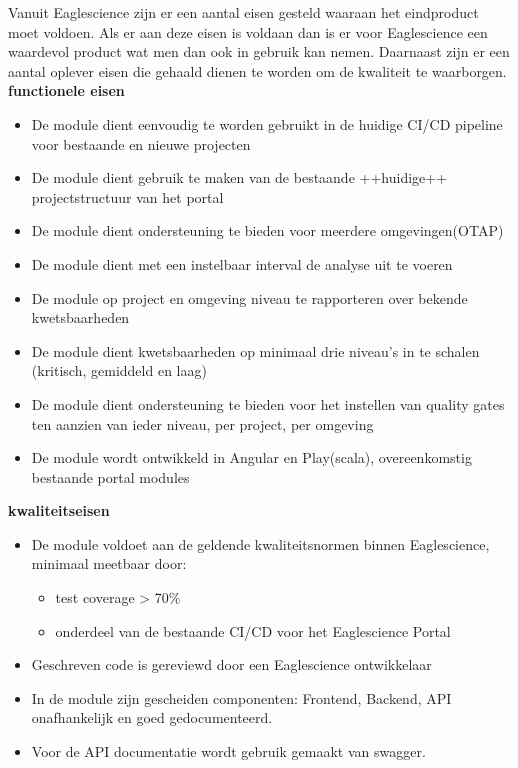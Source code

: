 Vanuit Eaglescience zijn er een aantal eisen gesteld waaraan het eindproduct moet voldoen. Als er aan deze eisen is voldaan dan is er voor Eaglescience een waardevol product wat men dan ook in gebruik kan nemen. Daarnaast zijn er een aantal oplever eisen die gehaald dienen te worden om de kwaliteit te waarborgen. \\

\textbf{functionele eisen}
\begin{itemize}
\item De module dient eenvoudig te worden gebruikt in de huidige CI/CD pipeline voor bestaande en nieuwe projecten
\item De module dient gebruik te maken van de bestaande ++huidige++ projectstructuur van het portal 
\item De module dient ondersteuning te bieden voor meerdere omgevingen(OTAP)
\item De module dient met een instelbaar interval de analyse uit te voeren
\item De module op project en omgeving niveau te rapporteren over bekende kwetsbaarheden
\item De module dient kwetsbaarheden op minimaal drie niveau’s in te schalen (kritisch, gemiddeld en laag)
\item De module dient ondersteuning te bieden voor het instellen van quality gates ten aanzien van ieder niveau, per project, per omgeving
\item De module wordt ontwikkeld in Angular en Play(scala), overeenkomstig bestaande portal modules
\end{itemize}
\textbf{kwaliteitseisen}
\begin{itemize}
\item De module voldoet aan de geldende kwaliteitsnormen binnen Eaglescience, minimaal meetbaar door:
	\begin{itemize}
	\item test coverage > 70\%
	\item onderdeel van de bestaande CI/CD voor het Eaglescience Portal
	\end{itemize}
\item Geschreven code is gereviewd door een Eaglescience ontwikkelaar
\item In de module zijn gescheiden componenten: Frontend, Backend, API onafhankelijk en goed gedocumenteerd.
\item Voor de API documentatie wordt gebruik gemaakt van swagger.
\end{itemize}

